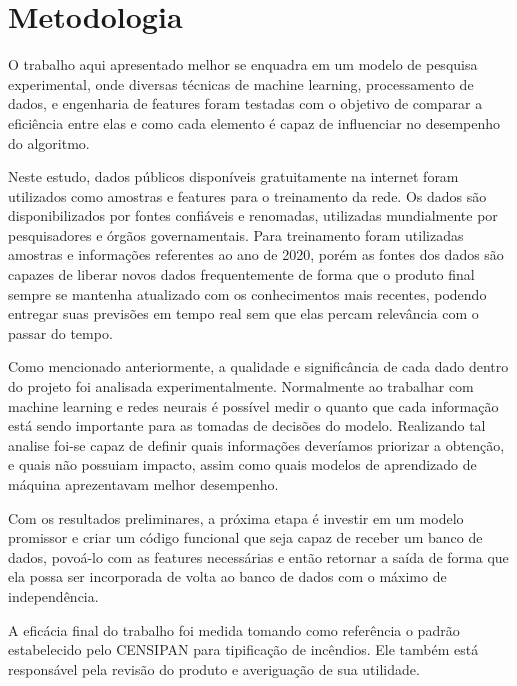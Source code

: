\section{Metodologia}

O trabalho aqui apresentado melhor se enquadra em um modelo de pesquisa experimental, onde diversas técnicas de machine learning, processamento de dados, e engenharia de features foram testadas com o objetivo de comparar a eficiência entre elas e como cada elemento é capaz de influenciar no desempenho do algoritmo.

Neste estudo, dados públicos disponíveis gratuitamente na internet foram utilizados como amostras e features para o treinamento da rede. Os dados são disponibilizados por fontes confiáveis e renomadas, utilizadas mundialmente por pesquisadores e órgãos governamentais. Para treinamento foram utilizadas amostras e informações referentes ao ano de 2020, porém as fontes dos dados são capazes de liberar novos dados frequentemente de forma que o produto final sempre se mantenha atualizado com os conhecimentos mais recentes, podendo entregar suas previsões em tempo real sem que elas percam relevância com o passar do tempo.

Como mencionado anteriormente, a qualidade e significância de cada dado dentro do projeto foi analisada experimentalmente. Normalmente ao trabalhar com machine learning e redes neurais é possível medir o quanto que cada informação está sendo importante para as tomadas de decisões do modelo. Realizando tal analise foi-se capaz de definir quais informações deveríamos priorizar a obtenção, e quais não possuiam impacto, assim como quais modelos de aprendizado de máquina aprezentavam melhor desempenho.

Com os resultados preliminares, a próxima etapa é investir em um modelo promissor e criar um código funcional que seja capaz de receber um banco de dados, povoá-lo com as features necessárias e então retornar a saída de forma que ela possa ser incorporada de volta ao banco de dados com o máximo de independência.

A eficácia final do trabalho foi medida tomando como referência o padrão estabelecido pelo CENSIPAN para tipificação de incêndios. Ele também está responsável pela revisão do produto e averiguação de sua utilidade.



   

